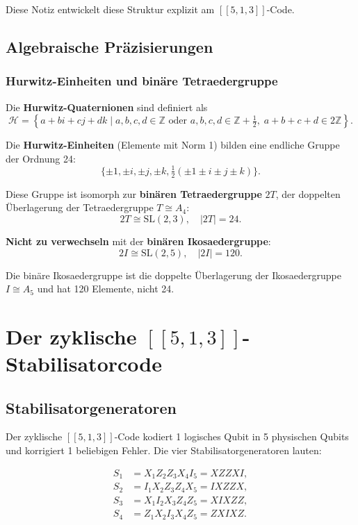 \documentclass[11pt,a4paper]{article}
\begin{document}
Diese Notiz entwickelt diese Struktur explizit am $[\![5,1,3]\!]$-Code.

\subsection{Algebraische Präzisierungen}

\subsubsection{Hurwitz-Einheiten und binäre Tetraedergruppe}

Die \textbf{Hurwitz-Quaternionen} sind definiert als
\[
\mathcal{H} = \left\{ a + bi + cj + dk \mid a,b,c,d \in \mathbb{Z} \text{ oder } a,b,c,d \in \mathbb{Z} + \tfrac{1}{2}, \; a+b+c+d \in 2\mathbb{Z} \right\}.
\]

Die \textbf{Hurwitz-Einheiten} (Elemente mit Norm 1) bilden eine endliche Gruppe der Ordnung 24:
\[
\{\pm 1, \pm i, \pm j, \pm k, \tfrac{1}{2}(\pm 1 \pm i \pm j \pm k)\}.
\]

Diese Gruppe ist isomorph zur \textbf{binären Tetraedergruppe} $2T$, der doppelten Überlagerung der Tetraedergruppe $T \cong A_4$:
\[
2T \cong \text{SL}(2,3), \quad |2T| = 24.
\]

\textbf{Nicht zu verwechseln} mit der \textbf{binären Ikosaedergruppe}:
\[
2I \cong \text{SL}(2,5), \quad |2I| = 120.
\]

Die binäre Ikosaedergruppe ist die doppelte Überlagerung der Ikosaedergruppe $I \cong A_5$ und hat 120 Elemente, nicht 24.

\section{Der zyklische $[\![5,1,3]\!]$-Stabilisatorcode}

\subsection{Stabilisatorgeneratoren}

Der zyklische $[\![5,1,3]\!]$-Code kodiert 1 logisches Qubit in 5 physischen Qubits und korrigiert 1 beliebigen Fehler. Die vier Stabilisatorgeneratoren lauten:

\begin{align}
S_1 &= X_1 Z_2 Z_3 X_4 I_5 = XZZXI, \\
S_2 &= I_1 X_2 Z_3 Z_4 X_5 = IXZZX, \\
S_3 &= X_1 I_2 X_3 Z_4 Z_5 = XIXZZ, \\
S_4 &= Z_1 X_2 I_3 X_4 Z_5 = ZXIXZ.
\end{align}
\end{document}
